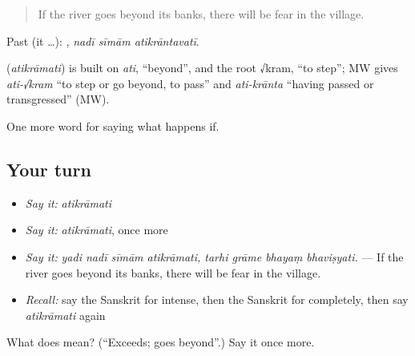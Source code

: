 \begin{quote}
If the river goes beyond its banks, there will be fear in the village.
\end{quote}

Past (it …):   , \emph{nadī sīmām atikrāntavatī}.

\begin{cousinweb}
\textbf{} (\emph{atikrāmati}) is built on \emph{ati}, \textquotedblleft{}beyond\textquotedblright{}, and the root √kram, \textquotedblleft{}to step\textquotedblright{}; MW gives \emph{ati-√kram} \textquotedblleft{}to step or go beyond, to pass\textquotedblright{} and \emph{ati-krānta} \textquotedblleft{}having passed or transgressed\textquotedblright{} (MW).
\end{cousinweb}

\begin{grammarlens}[title={What you've built}]
One more word for saying what happens if.
\end{grammarlens}

\subsection*{Your turn}
\begin{itemize}
\raggedright
  \item \emph{Say it:} \emph{atikrāmati}
  \item \emph{Say it:} \emph{atikrāmati}, once more
  \item \emph{Say it:} \emph{yadi nadī sīmām atikrāmati, tarhi grāme bhayaṃ bhaviṣyati.} — If the river goes beyond its banks, there will be fear in the village.
  \item \emph{Recall:} say the Sanskrit for intense, then the Sanskrit for completely, then say \emph{atikrāmati} again
\end{itemize}

\begin{tcolorbox}[breakable,colback=teal!4,colframe=teal!35!black,title={Before you move on}]
What does  mean? (\textquotedblleft{}Exceeds; goes beyond\textquotedblright{}.) Say it once more.
\end{tcolorbox}
